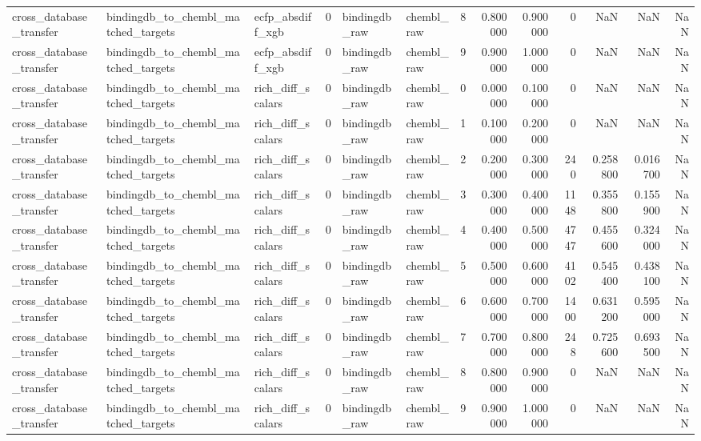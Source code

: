 \begin{longtable}{lllrllrrrrrrr}
cross\_database\_transfer & bindingdb\_to\_chembl\_matched\_targets & ecfp\_absdiff\_xgb & 0 & bindingdb\_raw & chembl\_raw & 8 & 0.800000 & 0.900000 & 0 & NaN & NaN & NaN \\
cross\_database\_transfer & bindingdb\_to\_chembl\_matched\_targets & ecfp\_absdiff\_xgb & 0 & bindingdb\_raw & chembl\_raw & 9 & 0.900000 & 1.000000 & 0 & NaN & NaN & NaN \\
cross\_database\_transfer & bindingdb\_to\_chembl\_matched\_targets & rich\_diff\_scalars & 0 & bindingdb\_raw & chembl\_raw & 0 & 0.000000 & 0.100000 & 0 & NaN & NaN & NaN \\
cross\_database\_transfer & bindingdb\_to\_chembl\_matched\_targets & rich\_diff\_scalars & 0 & bindingdb\_raw & chembl\_raw & 1 & 0.100000 & 0.200000 & 0 & NaN & NaN & NaN \\
cross\_database\_transfer & bindingdb\_to\_chembl\_matched\_targets & rich\_diff\_scalars & 0 & bindingdb\_raw & chembl\_raw & 2 & 0.200000 & 0.300000 & 240 & 0.258800 & 0.016700 & NaN \\
cross\_database\_transfer & bindingdb\_to\_chembl\_matched\_targets & rich\_diff\_scalars & 0 & bindingdb\_raw & chembl\_raw & 3 & 0.300000 & 0.400000 & 1148 & 0.355800 & 0.155900 & NaN \\
cross\_database\_transfer & bindingdb\_to\_chembl\_matched\_targets & rich\_diff\_scalars & 0 & bindingdb\_raw & chembl\_raw & 4 & 0.400000 & 0.500000 & 4747 & 0.455600 & 0.324000 & NaN \\
cross\_database\_transfer & bindingdb\_to\_chembl\_matched\_targets & rich\_diff\_scalars & 0 & bindingdb\_raw & chembl\_raw & 5 & 0.500000 & 0.600000 & 4102 & 0.545400 & 0.438100 & NaN \\
cross\_database\_transfer & bindingdb\_to\_chembl\_matched\_targets & rich\_diff\_scalars & 0 & bindingdb\_raw & chembl\_raw & 6 & 0.600000 & 0.700000 & 1400 & 0.631200 & 0.595000 & NaN \\
cross\_database\_transfer & bindingdb\_to\_chembl\_matched\_targets & rich\_diff\_scalars & 0 & bindingdb\_raw & chembl\_raw & 7 & 0.700000 & 0.800000 & 248 & 0.725600 & 0.693500 & NaN \\
cross\_database\_transfer & bindingdb\_to\_chembl\_matched\_targets & rich\_diff\_scalars & 0 & bindingdb\_raw & chembl\_raw & 8 & 0.800000 & 0.900000 & 0 & NaN & NaN & NaN \\
cross\_database\_transfer & bindingdb\_to\_chembl\_matched\_targets & rich\_diff\_scalars & 0 & bindingdb\_raw & chembl\_raw & 9 & 0.900000 & 1.000000 & 0 & NaN & NaN & NaN \\

\end{longtable}
